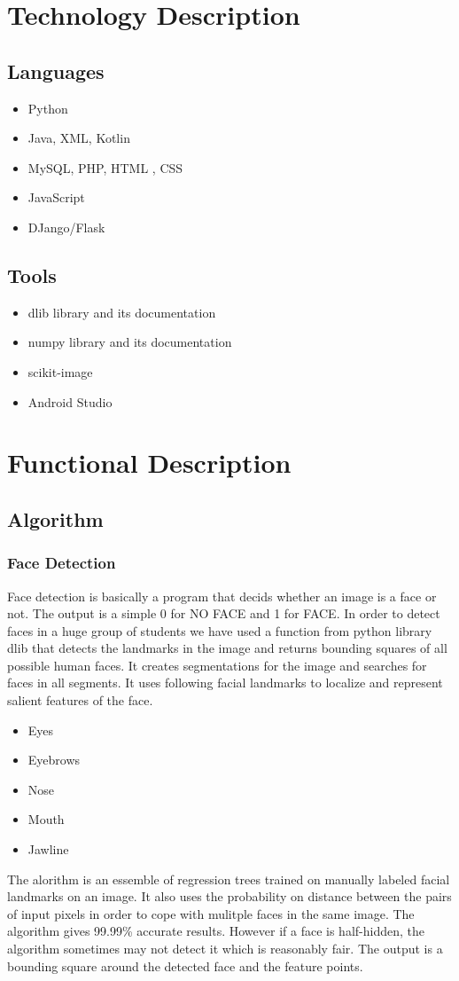 \documentclass{article}
\begin{document}
\section{Technology Description}
\subsection{Languages} 
\begin{itemize}
\item Python
\item Java, XML, Kotlin
\item MySQL, PHP, HTML , CSS
\item JavaScript
\item DJango/Flask
\end{itemize}
\subsection{Tools} 
\begin{itemize}
\item dlib library and its documentation
\item numpy library and its documentation
\item scikit-image 
\item Android Studio
\end{itemize}


\section{Functional Description}
\subsection{Algorithm} 
\subsubsection{Face Detection} Face detection is basically a program that decids whether an image is a face or not. The output is a simple 0 for NO FACE and 1 for FACE. In order to detect faces in a huge group of students we have used a function from python library dlib that detects the landmarks in the image and returns bounding squares of all possible human faces. It creates segmentations for the image and searches for faces in all segments.  It uses following facial landmarks to localize and represent salient features of the face.
\begin{itemize}
\item Eyes
\item Eyebrows
\item Nose
\item Mouth
\item Jawline
\end{itemize}
The alorithm is an essemble of regression trees trained on manually labeled facial landmarks on an image. It also uses the probability on distance between the pairs of input pixels in order to cope with mulitple faces in the same image. The algorithm gives 99.99\% accurate results. However if a face is half-hidden, the algorithm sometimes may not detect it which is reasonably fair. The output is a bounding square around the detected face and the feature points.
\end{document}

